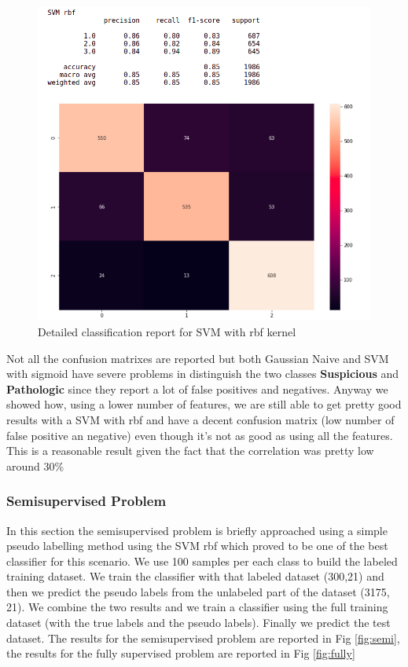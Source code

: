 \documentclass[a4paper,12pt]{article}
\begin{document}
\begin{figure}[H]
  \begin{center}
  \includegraphics[width=1.0\textwidth]{images/svm_rbf_corr.png}
  \end{center}
  \caption{Detailed classification report for SVM with rbf kernel}
  \label{fig:poly}
\end{figure}

\noindent Not all the confusion matrixes are reported but both Gaussian Naive and SVM with sigmoid have severe problems in distinguish the two classes \textbf{Suspicious} and \textbf{Pathologic} since they report a lot of false positives and negatives. Anyway we showed how, using a lower number of features, we are still able to get pretty good results with a SVM with rbf and have a decent confusion matrix (low number of false positive an negative) even though it's not as good as using all the features. This is a reasonable result given the fact that the correlation was pretty low around 30\%

\subsubsection{Semisupervised Problem}
In this section the semisupervised problem is briefly approached using a simple pseudo labelling method using the SVM rbf which proved to be one of the best classifier for this scenario. We use 100 samples per each class to build the labeled training dataset. We train the classifier with that labeled dataset (300,21) and then we predict the pseudo labels from the unlabeled part of the dataset (3175, 21). We combine the two results and we train a classifier using the full training dataset (with the true labels and the pseudo labels). Finally we predict the test dataset. The results for the semisupervised problem are reported in Fig \ref{fig:semi}, the results for the fully supervised problem are reported in Fig \ref{fig:fully}  
\end{document}
